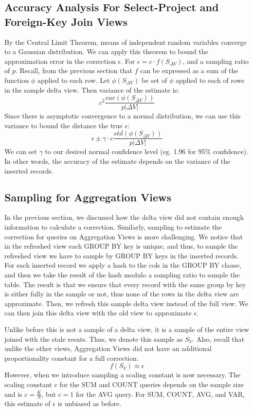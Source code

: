 \subsection{Accuracy Analysis For Select-Project and Foreign-Key Join Views}
By the Central Limit Theorem, means of independent random variables converge 
to a Gaussian distribution.
We can apply this theorem to bound the approximation error in the correction $\epsilon$.
For $\epsilon = c\cdot f(S_{\Delta V})$, and a sampling ratio of $p$.
Recall, from the previous section that $f$ can be expressed as a sum of the function $\phi$ applied to each row.
Let $\phi(S_{\Delta V})$ be set of $\phi$ applied to each of rows in the sample delta view.
Then variance of the estimate is:
\[
c^2\frac{var(\phi(S_{\Delta V}))}{p|\Delta V|}
\] 
Since there is asymptotic convergence to a normal distribution, we can use this variance to bound the distance the true $\epsilon$:   
\[
\epsilon \pm \gamma \cdot c\frac{std(\phi(S_{\Delta V}))}{p|\Delta V|}
\]
We can set $\gamma$ to our desired normal confidence level (eg. 1.96 for 95\% confidence).
In other words, the accuracy of the estimate depends on the variance of the inserted records.

\subsection{Sampling for Aggregation Views}
In the previous section, we discussed how the delta view did not contain enough
information to calculate a correction.
Similarly, sampling to estimate the correction for queries on Aggregation Views
is more challenging.
We notice that in the refreshed view each GROUP BY key is unique, and
thus, to sample the refreshed view we have to sample by GROUP BY keys
in the inserted records. For each inserted record we apply a hash
to the cols in the GROUP BY clause, and then we take the result of
the hash modulo a sampling ratio to sample the table. The result is
that we ensure that every record with the same group by key is either
fully in the sample or not, thus none of the rows in the delta view
are approximate. 
Then, we refresh this sample delta view instead of the full view.
We can then join this delta view with the old view to approximate $\epsilon$.

Unlike before this is not a sample of a delta view, it is a sample of the entire view joined with the stale resuts.
Thus, we denote this sample as $S_{V}$.
Also, recall that unlike the other views, Aggregation Views did not have 
an additional proportionality constant for a full correction.
\[
f(S_{V})\approx\epsilon
\]
However, when we introduce sampling a scaling constant is now necessary.
The scaling constant $c$ for the SUM and COUNT queries depends on the sample size and is $c = \frac{K}{N}$, 
but $c = 1$ for the AVG query.
For SUM, COUNT, AVG, and VAR, this estimate of $\epsilon$ is unbiased as before.

